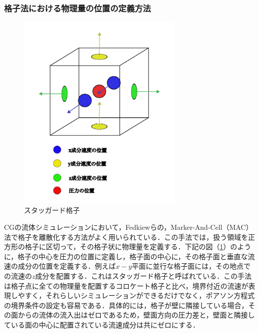 \documentclass[a4j,12pt]{jreport}
\begin{document}
\subsubsection{格子法における物理量の位置の定義方法} \label{subsec:grid_sampling}
\begin{figure}[htbp]
\begin{center}
\includegraphics[width=80mm]{3dstaggerd.png}
\caption{スタッガード格子}
\label{fig:staggerd}
\end{center}
\end{figure}

CGの流体シミュレーションにおいて，Fedkiewらの，Marker-And-Cell（MAC）法で格子を離散化する方法がよく用いられている．この手法では，扱う領域を正方形の格子に区切って，その格子状に物理量を定義する．下記の図（\ref{fig:staggerd}）のように，格子の中心を圧力の位置に定義し，格子面の中心に，その格子面と垂直な流速の成分の位置を定義する．例えば$x-y$平面に並行な格子面には，その地点での流速の$z$成分を配置する．これはスタッガード格子と呼ばれている．この手法は格子点に全ての物理量を配置するコロケート格子と比べ，境界付近の流速が表現しやすく，それらしいシミュレーションができるだけでなく，ポアソン方程式の境界条件の設定も容易である．具体的には，格子が壁に隣接している場合，その面からの流体の流入出はゼロであるため，壁面方向の圧力差と，壁面と隣接している面の中心に配置されている流速成分は共にゼロにする．
\end{document}
